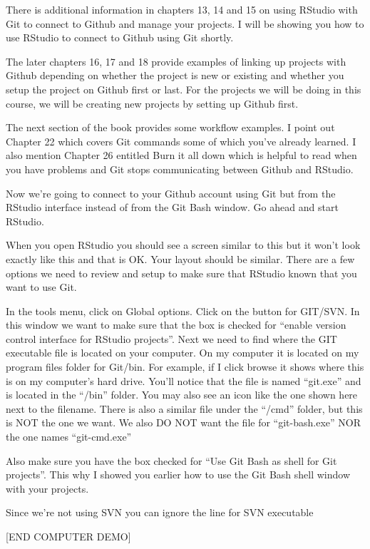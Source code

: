 \documentclass[
]{book}
\begin{document}
There is additional information in chapters 13, 14 and 15 on using RStudio with Git to connect to Github and manage your projects. I will be showing you how to use RStudio to connect to Github using Git shortly.

The later chapters 16, 17 and 18 provide examples of linking up projects with Github depending on whether the project is new or existing and whether you setup the project on Github first or last. For the projects we will be doing in this course, we will be creating new projects by setting up Github first.

The next section of the book provides some workflow examples. I point out Chapter 22 which covers Git commands some of which you've already learned. I also mention Chapter 26 entitled Burn it all down which is helpful to read when you have problems and Git stops communicating between Github and RStudio.

Now we're going to connect to your Github account using Git but from the RStudio interface instead of from the Git Bash window. Go ahead and start RStudio.

When you open RStudio you should see a screen similar to this but it won't look exactly like this and that is OK. Your layout should be similar. There are a few options we need to review and setup to make sure that RStudio known that you want to use Git.

In the tools menu, click on Global options. Click on the button for GIT/SVN. In this window we want to make sure that the box is checked for ``enable version control interface for RStudio projects''. Next we need to find where the GIT executable file is located on your computer. On my computer it is located on my program files folder for Git/bin. For example, if I click browse it shows where this is on my computer's hard drive. You'll notice that the file is named ``git.exe'' and is located in the ``/bin'' folder. You may also see an icon like the one shown here next to the filename. There is also a similar file under the ``/cmd'' folder, but this is NOT the one we want. We also DO NOT want the file for ``git-bash.exe'' NOR the one names ``git-cmd.exe''

Also make sure you have the box checked for ``Use Git Bash as shell for Git projects''. This why I showed you earlier how to use the Git Bash shell window with your projects.

Since we're not using SVN you can ignore the line for SVN executable

{[}END COMPUTER DEMO{]}
\end{document}
